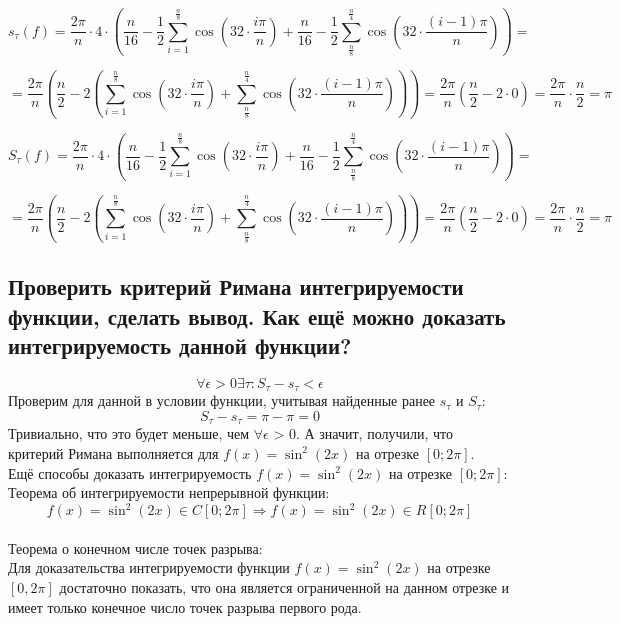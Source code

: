 \documentclass{article}
\begin{document}
$$s_\tau(f) = \frac{2\pi}{n} \cdot 4 \cdot \left( \frac{n}{16} - \frac{1}{2} \sum_{i=1}^{\frac{n}{8}} \cos(32 \cdot \frac{i\pi}{n}) + \frac{n}{16} - \frac{1}{2} \sum_{\frac{n}{8}}^{\frac{n}{4}} \cos(32 \cdot \frac{(i-1)\pi}{n}) \right) = 
$$

$$
= \frac{2\pi}{n} \left( \frac{n}{2} - 2 ( \sum_{i=1}^{\frac{n}{8}} \cos(32 \cdot \frac{i\pi}{n}) + \sum_{\frac{n}{8}}^{\frac{n}{4}} \cos(32 \cdot \frac{(i-1)\pi}{n})) \right) = 
 \frac{2\pi}{n} \left( \frac{n}{2} - 2 \cdot 0\right) = \frac{2\pi}{n}\cdot\frac{n}{2} = \boxed{\pi}$$

$$S_\tau(f) = \frac{2\pi}{n} \cdot 4 \cdot \left( \frac{n}{16} - \frac{1}{2} \sum_{i=1}^{\frac{n}{8}} \cos(32 \cdot \frac{i\pi}{n}) + \frac{n}{16} - \frac{1}{2} \sum_{\frac{n}{8}}^{\frac{n}{4}} \cos(32 \cdot \frac{(i-1)\pi}{n}) \right) = 
$$

$$
= \frac{2\pi}{n} \left( \frac{n}{2} - 2 ( \sum_{i=1}^{\frac{n}{8}} \cos(32 \cdot \frac{i\pi}{n}) + \sum_{\frac{n}{8}}^{\frac{n}{4}} \cos(32 \cdot \frac{(i-1)\pi}{n})) \right) = 
 \frac{2\pi}{n} \left( \frac{n}{2} - 2 \cdot 0\right) = \frac{2\pi}{n}\cdot\frac{n}{2} = \boxed{\pi}$$
\begin{center}
\subsection*{Проверить критерий Римана интегрируемости функции, сделать вывод. Как ещё можно доказать интегрируемость данной функции?}
\end{center}
$$\forall \epsilon > 0 \exists \tau : S_\tau-s_\tau < \epsilon$$
Проверим для данной в условии функции, учитывая найденные ранее $s_\tau$ и $S_\tau$:
$$ S_\tau - s_\tau = \pi - \pi = 0 $$
Тривиально, что это будет меньше, чем $\forall \epsilon$ > 0. А значит, получили, что критерий Римана выполняется для $f(x)=\sin^2(2x)$ на отрезке $[0; 2\pi]$.\\
Ещё способы доказать интегрируемость $f(x)=\sin^2(2x)$ на отрезке $[0; 2\pi]$:\\
Теорема об интегрируемости непрерывной функции:\\
$$f(x)=\sin^2(2x) \in C[0; 2\pi] \Rightarrow f(x)=\sin^2(2x) \in R[0; 2\pi]$$\\
Теорема о конечном числе точек разрыва:\\
Для доказательства интегрируемости функции $f(x)=\sin^2(2x)$ на отрезке $[0,2\pi]$ достаточно показать, что она является ограниченной на данном отрезке и имеет только конечное число точек разрыва первого рода.
\end{document}
